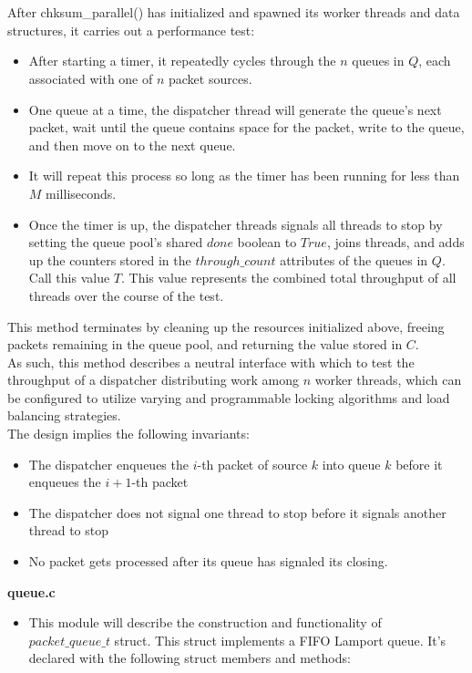 \documentclass[]{article}
\begin{document}
\begin{itemize}
\begin{itemize}
		\\\\
		After chksum\_parallel() has initialized and spawned its worker threads and data structures, it carries out a performance test:
		\begin{itemize}
			\item After starting a timer, it repeatedly cycles through the $n$ queues in $Q$, each associated with one of $n$ packet sources. 
			\item One queue at a time, the dispatcher thread will generate the queue's next packet, wait until the queue contains space for the packet, write to the queue, and then move on to the next queue. 
			\item It will repeat this process so long as the timer has been running for less than $M$ milliseconds. 
			\item Once the timer is up, the dispatcher threads signals all threads to stop by setting the queue pool's shared $done$ boolean to $True$, joins threads, and adds up the counters stored in the $through\_count$ attributes of the queues in $Q$. Call this value $T$. This value represents the combined total throughput of all threads over the course of the test.
		\end{itemize}
		This method terminates by cleaning up the resources initialized above, freeing packets remaining in the queue pool, and returning the value stored in $C$.
		\\
		As such, this method describes a neutral interface with which to test the throughput of a dispatcher distributing work among $n$ worker threads, which can be configured to utilize varying and programmable locking algorithms and load balancing strategies.
		\\
		The design implies the following invariants:
		\begin{itemize}
			\item The dispatcher enqueues the $i$-th packet of source $k$ into queue $k$ before it enqueues the $i+1$-th packet
			\item The dispatcher does not signal one thread to stop before it signals another thread to stop
			\item No packet gets processed after its queue has signaled its closing.
		\end{itemize}
	\end{itemize}
	\textbf{queue.c}
	\begin{itemize}
		\item This module will describe the construction and functionality of  $packet\_queue\_t$ struct. This struct implements a FIFO Lamport queue. It's declared with the following struct members and methods:

\end{itemize}
\end{itemize}
\end{document}
